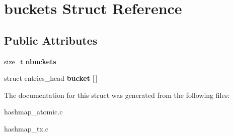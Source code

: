 \hypertarget{structbuckets}{}\section{buckets Struct Reference}
\label{structbuckets}
\subsection*{Public Attributes}
\begin{DoxyCompactItemize}
\item 
size\+\_\+t {\bfseries nbuckets}\hypertarget{structbuckets_ab4b1efc42ff06fef401feb5297469441}{}\label{structbuckets_ab4b1efc42ff06fef401feb5297469441}

\item 
struct entries\+\_\+head {\bfseries bucket} \mbox{[}$\,$\mbox{]}\hypertarget{structbuckets_a563609796b380211a16c9f0eb07c4ff6}{}\label{structbuckets_a563609796b380211a16c9f0eb07c4ff6}

\end{DoxyCompactItemize}


The documentation for this struct was generated from the following files\+:\begin{DoxyCompactItemize}
\item 
hashmap\+\_\+atomic.\+c\item 
hashmap\+\_\+tx.\+c\end{DoxyCompactItemize}
